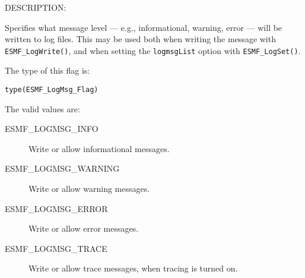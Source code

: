 {\sf DESCRIPTION:\\}
\begin{sloppypar}
Specifies what message level --- e.g., informational, warning, 
error --- will be written to log files.  This may be used both when
writing the message with {\tt ESMF\_LogWrite()}, and when setting the
{\tt logmsgList} option with {\tt ESMF\_LogSet()}.
\end{sloppypar}

The type of this flag is:

{\tt type(ESMF\_LogMsg\_Flag)}

The valid values are:
\begin{description}
   \item [ESMF\_LOGMSG\_INFO] 
         Write or allow informational messages.
   \item [ESMF\_LOGMSG\_WARNING]
         Write or allow warning messages.
   \item [ESMF\_LOGMSG\_ERROR]
         Write or allow error messages.
   \item [ESMF\_LOGMSG\_TRACE]
         Write or allow trace messages, when tracing is turned on.
\end{description}




